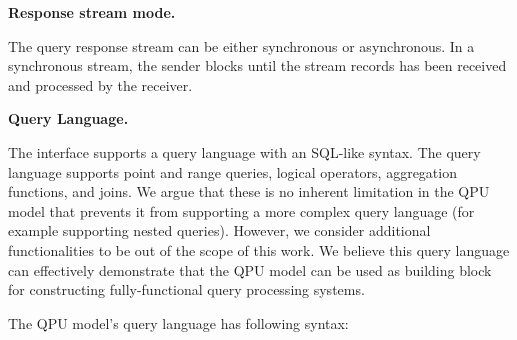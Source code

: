 
\bigskip
\noindent
\textbf{Response stream mode.}

\noindent
The query response stream can be either synchronous or asynchronous.
In a synchronous stream, the sender blocks until the stream records has been received and processed by the receiver.

\bigskip
\noindent
\textbf{Query Language.}

\noindent
The interface supports a query language with an SQL-like syntax.
The query language supports point and range queries, logical operators, aggregation functions, and joins.
We argue that these is no inherent limitation in the QPU model that prevents it from supporting a more complex
query language (for example supporting nested queries).
However, we consider additional functionalities to be out of the scope of this work.
We believe this query language can effectively demonstrate that the QPU model can be used as building
block for constructing fully-functional query processing systems.

The QPU model's query language has following syntax:

